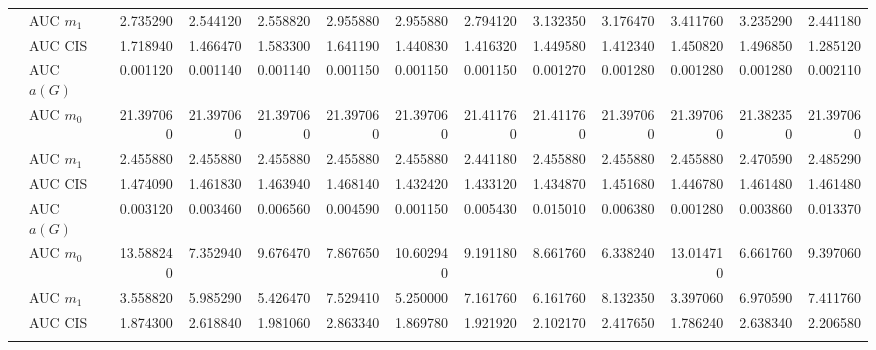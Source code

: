 \begin{table}[htbp]
\begin{tabular}{llrrrrrrrrrrr}
    & AUC $m_1$ & 2.735290 & 2.544120 & 2.558820 & 2.955880 & 2.955880 & 2.794120 & 3.132350 & 3.176470 & 3.411760 & 3.235290 & 2.441180 \\
    & AUC CIS & 1.718940 & 1.466470 & 1.583300 & 1.641190 & 1.440830 & 1.416320 & 1.449580 & 1.412340 & 1.450820 & 1.496850 & 1.285120 \\
    \addlinespace
    \multirow{4}{*}{degree} & AUC $a(G)$ & 0.001120 & 0.001140 & 0.001140 & 0.001150 & 0.001150 & 0.001150 & 0.001270 & 0.001280 & 0.001280 & 0.001280 & 0.002110 \\
    & AUC $m_0$ & 21.397060 & 21.397060 & 21.397060 & 21.397060 & 21.397060 & 21.411760 & 21.411760 & 21.397060 & 21.397060 & 21.382350 & 21.397060 \\
    & AUC $m_1$ & 2.455880 & 2.455880 & 2.455880 & 2.455880 & 2.455880 & 2.441180 & 2.455880 & 2.455880 & 2.455880 & 2.470590 & 2.485290 \\
    & AUC CIS & 1.474090 & 1.461830 & 1.463940 & 1.468140 & 1.432420 & 1.433120 & 1.434870 & 1.451680 & 1.446780 & 1.461480 & 1.461480 \\
    \addlinespace
    \multirow{4}{*}{random} & AUC $a(G)$ & 0.003120 & 0.003460 & 0.006560 & 0.004590 & 0.001150 & 0.005430 & 0.015010 & 0.006380 & 0.001280 & 0.003860 & 0.013370 \\
    & AUC $m_0$ & 13.588240 & 7.352940 & 9.676470 & 7.867650 & 10.602940 & 9.191180 & 8.661760 & 6.338240 & 13.014710 & 6.661760 & 9.397060 \\
    & AUC $m_1$ & 3.558820 & 5.985290 & 5.426470 & 7.529410 & 5.250000 & 7.161760 & 6.161760 & 8.132350 & 3.397060 & 6.970590 & 7.411760 \\
    & AUC CIS & 1.874300 & 2.618840 & 1.981060 & 2.863340 & 1.869780 & 1.921920 & 2.102170 & 2.417650 & 1.786240 & 2.638340 & 2.206580 \\
    \addlinespace
    \bottomrule
  \end{tabular}
\end{table}

